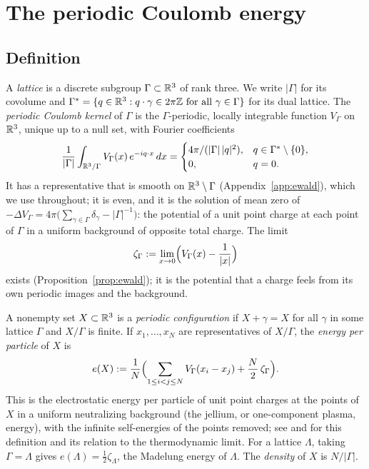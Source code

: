 \section{The periodic Coulomb energy}\label{sec:setting}

\subsection{Definition}\label{ssec:energy}

A \emph{lattice} is a discrete subgroup $\Gamma\subset\mathbb R^3$ of rank three. We write $|\Gamma|$ for its covolume and
$\Gamma^*=\{q\in\mathbb R^3: q\cdot\gamma\in2\pi\mathbb Z\text{ for all }\gamma\in\Gamma\}$ for its dual lattice. The \emph{periodic Coulomb kernel}
of $\Gamma$ is the $\Gamma$-periodic, locally integrable function $V_\Gamma$ on $\mathbb R^3$, unique up to a null set, with Fourier
coefficients
\begin{equation}\label{eq:GF}
  \frac1{|\Gamma|}\int_{\mathbb R^3/\Gamma}V_\Gamma(x)\,e^{-iq\cdot x}\,dx=\begin{cases}4\pi/(|\Gamma|\,|q|^2),&q\in\Gamma^*\setminus\{0\},\\ 0,&q=0.\end{cases}
\end{equation}
It has a representative that is smooth on $\mathbb R^3\setminus\Gamma$ (Appendix~\ref{app:ewald}), which we use throughout; it is even,
and it is the solution of mean zero of
$-\Delta V_\Gamma=4\pi\bigl(\sum_{\gamma\in\Gamma}\delta_\gamma-|\Gamma|^{-1}\bigr)$: the potential of a unit point charge at each point of
$\Gamma$ in a uniform background of opposite total charge. The limit
\begin{equation}\label{eq:zeta}
  \zeta_\Gamma:=\lim_{x\to0}\Bigl(V_\Gamma(x)-\frac1{|x|}\Bigr)
\end{equation}
exists (Proposition~\ref{prop:ewald}); it is the potential that a charge feels from its own periodic images and the background.

A nonempty set $X\subset\mathbb R^3$ is a \emph{periodic configuration} if $X+\gamma=X$ for all $\gamma$ in some lattice $\Gamma$ and $X/\Gamma$ is
finite.
If $x_1,\dots,x_N$ are representatives of $X/\Gamma$, the \emph{energy per particle} of $X$ is
\begin{equation}\label{eq:edef}
  e(X):=\frac1N\Bigl(\sum_{1\le i<j\le N}V_\Gamma(x_i-x_j)+\frac N2\,\zeta_\Gamma\Bigr).
\end{equation}
This is the electrostatic energy per particle of unit point charges at the points of $X$ in a uniform neutralizing background
(the jellium, or one-component plasma, energy), with the infinite self-energies of the points removed; see
\cite[Section~IV]{Lewin2022} and \cite[Appendix~B]{RougerieSerfaty2016} for this definition and its relation to the thermodynamic
limit. For a lattice $\Lambda$, taking
$\Gamma=\Lambda$ gives $e(\Lambda)=\frac12\zeta_\Lambda$, the Madelung energy of $\Lambda$. The \emph{density} of $X$ is $N/|\Gamma|$.

